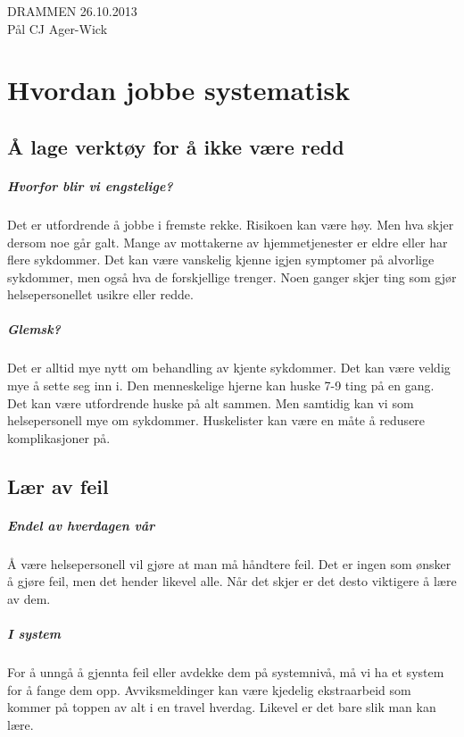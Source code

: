 \documentclass[a4paper,12pt,twoside]{memoir}
\begin{document}
				DRAMMEN 26.10.2013\\[0.4in]

				Pål CJ Ager-Wick

	\newpage
	\tableofcontents

\mainmatter
	\chapter{Hvordan jobbe systematisk}
		\section{Å lage verktøy for å ikke være redd}
			\paragraph{Hvorfor blir vi engstelige?\\}
				Det er utfordrende å jobbe i fremste rekke. Risikoen kan være høy. Men hva skjer dersom noe går galt. Mange av mottakerne av hjemmetjenester er eldre eller har flere sykdommer. Det kan være vanskelig kjenne igjen symptomer på alvorlige sykdommer, men også hva de forskjellige trenger. Noen ganger skjer ting som gjør helsepersonellet usikre eller redde.
			\paragraph{Glemsk?\\}
				Det er alltid mye nytt om behandling av kjente sykdommer. Det kan være veldig mye å sette seg inn i. Den menneskelige hjerne kan huske 7-9 ting på en gang. Det kan være utfordrende huske på alt sammen. Men samtidig kan vi som helsepersonell mye om sykdommer. Huskelister kan være en måte å redusere komplikasjoner på\cite{FA-gawande}.
		\section{Lær av feil}
			\paragraph{Endel av hverdagen vår\\}
				Å være helsepersonell vil gjøre at man må håndtere feil. Det er ingen som ønsker å gjøre feil, men det hender likevel alle. Når det skjer er det desto viktigere å lære av dem.
			\paragraph{I system\\}
				For å unngå å gjennta feil eller avdekke dem på systemnivå, må vi ha et system for å fange dem opp. Avviksmeldinger kan være kjedelig ekstraarbeid som kommer på toppen av alt i en travel hverdag. Likevel er det bare slik man kan lære.
\end{document}
